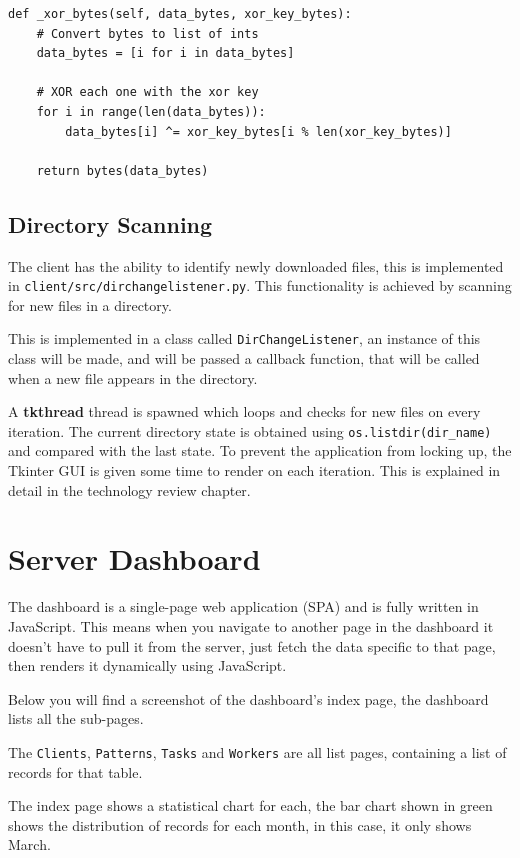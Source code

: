 \begin{lstlisting}
def _xor_bytes(self, data_bytes, xor_key_bytes):
    # Convert bytes to list of ints
    data_bytes = [i for i in data_bytes]

    # XOR each one with the xor key
    for i in range(len(data_bytes)):
        data_bytes[i] ^= xor_key_bytes[i % len(xor_key_bytes)]

    return bytes(data_bytes)
\end{lstlisting}

\subsection{Directory Scanning}
The client has the ability to identify newly downloaded files,
this is implemented in \texttt{client/src/dirchangelistener.py}.
This functionality is achieved by scanning for new files in a directory.

This is implemented in a class called \texttt{DirChangeListener},
an instance of this class will be made, and will be passed a callback function,
that will be called when a new file appears in the directory.

A \textbf{tkthread} thread is spawned which loops
and checks for new files on every iteration.
The current directory state is obtained using
\texttt{os.listdir(dir\_name)} and compared with the last state.
To prevent the application from locking up,
the Tkinter GUI is given some time to render on each iteration.
This is explained in detail in the technology review chapter.

\section{Server Dashboard}
The dashboard is a single-page web application (SPA)
and is fully written in JavaScript.
This means when you navigate to another page in the dashboard
it doesn't have to pull it from the server,
just fetch the data specific to that page,
then renders it dynamically using JavaScript.

Below you will find a screenshot of the dashboard's index page,
the dashboard lists all the sub-pages.

The \texttt{Clients}, \texttt{Patterns}, \texttt{Tasks} and \texttt{Workers} are all
list pages, containing a list of records for that table.

The index page shows a statistical chart for each,
the bar chart shown in green shows the distribution of records for each month,
in this case, it only shows March.

